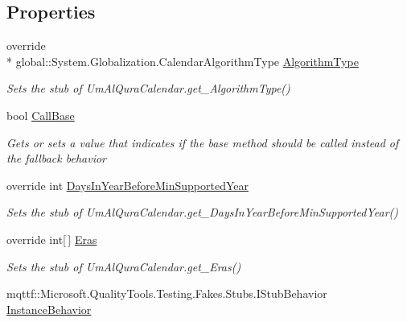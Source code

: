 \subsection*{Properties}
\begin{DoxyCompactItemize}
\item 
override \\*
global\-::\-System.\-Globalization.\-Calendar\-Algorithm\-Type \hyperlink{class_system_1_1_globalization_1_1_fakes_1_1_stub_um_al_qura_calendar_a51786c6e4df889062f968d7f0cf3dfd5}{Algorithm\-Type}
\begin{DoxyCompactList}\small\item\em Sets the stub of Um\-Al\-Qura\-Calendar.\-get\-\_\-\-Algorithm\-Type()\end{DoxyCompactList}\item 
bool \hyperlink{class_system_1_1_globalization_1_1_fakes_1_1_stub_um_al_qura_calendar_ad02d3bd94ed81cb6941d2553f1794da0}{Call\-Base}
\begin{DoxyCompactList}\small\item\em Gets or sets a value that indicates if the base method should be called instead of the fallback behavior\end{DoxyCompactList}\item 
override int \hyperlink{class_system_1_1_globalization_1_1_fakes_1_1_stub_um_al_qura_calendar_aa8830825fa66ec1a5d4d32f87ad046fb}{Days\-In\-Year\-Before\-Min\-Supported\-Year}
\begin{DoxyCompactList}\small\item\em Sets the stub of Um\-Al\-Qura\-Calendar.\-get\-\_\-\-Days\-In\-Year\-Before\-Min\-Supported\-Year()\end{DoxyCompactList}\item 
override int\mbox{[}$\,$\mbox{]} \hyperlink{class_system_1_1_globalization_1_1_fakes_1_1_stub_um_al_qura_calendar_a76291ead9e535775a2084876057fe165}{Eras}
\begin{DoxyCompactList}\small\item\em Sets the stub of Um\-Al\-Qura\-Calendar.\-get\-\_\-\-Eras()\end{DoxyCompactList}\item 
mqttf\-::\-Microsoft.\-Quality\-Tools.\-Testing.\-Fakes.\-Stubs.\-I\-Stub\-Behavior \hyperlink{class_system_1_1_globalization_1_1_fakes_1_1_stub_um_al_qura_calendar_acab96834d402e150e91f18f103fd05d2}{Instance\-Behavior}

\end{DoxyCompactItemize}
